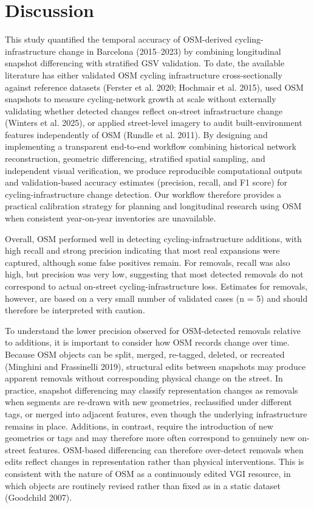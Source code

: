 \documentclass[
]{article}
\begin{document}
\section{Discussion}\label{discussion}

This study quantified the temporal accuracy of OSM-derived
cycling-infrastructure change in Barcelona (2015--2023) by combining
longitudinal snapshot differencing with stratified GSV validation. To
date, the available literature has either validated OSM cycling
infrastructure cross-sectionally against reference datasets (Ferster et
al. 2020; Hochmair et al. 2015), used OSM snapshots to measure
cycling-network growth at scale without externally validating whether
detected changes reflect on-street infrastructure change (Winters et al.
2025), or applied street-level imagery to audit built-environment
features independently of OSM (Rundle et al. 2011). By designing and
implementing a transparent end-to-end workflow combining historical
network reconstruction, geometric differencing, stratified spatial
sampling, and independent visual verification, we produce reproducible
\color{blue}computational outputs and validation-based accuracy
estimates \color{black} (precision, recall, and F1 score) for
cycling-infrastructure change detection. Our workflow therefore provides
a practical calibration strategy for planning and longitudinal research
using OSM when \color{black}consistent \color{black} year-on-year
inventories are unavailable.

\color{blue}Overall, OSM performed well in detecting
cycling-infrastructure additions, with high recall and strong precision
indicating that most real expansions were captured, although some false
positives remain. For removals, recall was also high, but precision was
very low, suggesting that most detected removals do not correspond to
actual on-street cycling-infrastructure loss. Estimates for removals,
however, are based on a very small number of validated cases (n = 5) and
should therefore be interpreted with caution.\color{black}

To understand the lower precision observed for OSM-detected removals
relative to additions, it is important to consider how OSM records
change over time. Because OSM objects can be split, merged, re-tagged,
deleted, or recreated (Minghini and Frassinelli 2019), structural edits
between snapshots may produce apparent removals without corresponding
physical change on the street. In practice, snapshot differencing may
classify representation changes as removals when segments are re-drawn
with new geometries, reclassified under different tags, or merged into
adjacent features, even though the underlying infrastructure remains in
place. Additions, in contrast, require the introduction of new
geometries or tags and may therefore more often correspond to genuinely
new on-street features. OSM-based differencing can therefore over-detect
removals when edits reflect changes in representation rather than
physical interventions. This is consistent with the nature of OSM as a
continuously edited VGI resource, in which objects are routinely revised
rather than fixed as in a static dataset (Goodchild 2007).
\end{document}

